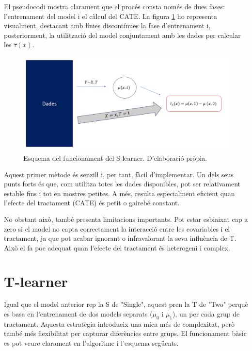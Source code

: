 \documentclass[../main.tex]{subfiles}
\begin{document}
    El pseudocodi mostra clarament que el procés consta només de dues fases: l'entrenament del model i el càlcul del CATE. La figura \ref{fig:sl} ho representa visualment, destacant amb línies discontínues la fase d’entrenament i, posteriorment, la utilització del model conjuntament amb les dades per calcular les $\hat{\tau}(x)$.
    
    \begin{figure}[H]
        \centering
        \includegraphics[width=0.8\linewidth]{imgs/s-learner.png}
        \caption{Esquema del funcionament del S-learner. D'elaboració pròpia.}
        \label{fig:sl}
    \end{figure}

    Aquest primer mètode és senzill i, per tant, fàcil d’implementar. Un dels seus punts forts és que, com utilitza totes les dades disponibles, pot ser relativament estable fins i tot en mostres petites. A més, resulta especialment eficient quan l’efecte del tractament (CATE) és petit o gairebé constant.\par
    No obstant això, també presenta limitacions importants. Pot estar esbiaixat cap a zero si el model no capta correctament la interacció entre les covariables i el tractament, ja que pot acabar ignorant o infravalorant la seva influència de T. Això el fa poc adequat quan l’efecte del tractament és heterogeni i complex.

    
    \section{T-learner} \label{sec:tlearner}
    Igual que el model anterior rep la S de "Single", aquest pren la T de "Two" perquè es basa en l’entrenament de dos models separats ($\mu_0$ i $\mu_1$), un per cada grup de tractament. Aquesta estratègia introdueix una mica més de complexitat, però també més flexibilitat per capturar diferències entre grups. El funcionament bàsic es pot veure clarament en l’algoritme i l’esquema següents.
    
\end{document}
